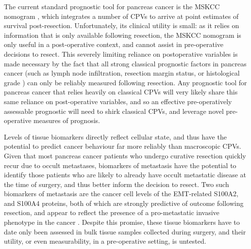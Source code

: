 \documentclass[dissertation.tex]{subfiles}
\begin{document}
The current standard prognostic tool for pancreas cancer is the \gls{MSKCC} nomogram \cite{Brennan2004}, which integrates a number of \glspl{CPV} to arrive at point estimates of survival post-resection.  Unfortunately, its clinical utility is small: as it relies on information that is only available following resection, the \gls{MSKCC} nomogram is only useful in a post-operative context, and cannot assist in pre-operative decisions to resect.  This severely limiting reliance on postoperative variables is made necessary by the fact that all strong classical prognostic factors in pancreas cancer (such as lymph node infiltration, resection margin status, or histological grade \cite{Bilici2014}) can only be reliably measured following resection.  Any prognostic tool for pancreas cancer that relies heavily on classical \glspl{CPV} will very likely share this same reliance on post-operative variables, and so an effective pre-operatively assessable prognostic will need to shirk classical \glspl{CPV}, and leverage novel pre-operative measures of prognosis.

Levels of tissue biomarkers directly reflect cellular state, and thus have the potential to predict cancer behaviour far more reliably than macroscopic \glspl{CPV}.  Given that most pancreas cancer patients who undergo curative resection quickly recur due to occult metastases, biomarkers of metastasis have the potential to identify those patients who are likely to already have occult metastatic disease at the time of surgery, and thus better inform the decision to resect.  Two such biomarkers of metastasis are the cancer cell levels of the \gls{EMT}-related S100A2, and S100A4 proteins, both of which are strongly predictive of outcome following resection, and appear to reflect the presence of a pro-metastatic invasive phenotype in the cancer \cite{Biankin2008, Tsukamoto2013, Lee2014}.  Despite this promise, these tissue biomarkers have to date only been assessed in bulk tissue samples collected during surgery, and their utility, or even measurability, in a pre-operative setting, is untested.
\end{document}
